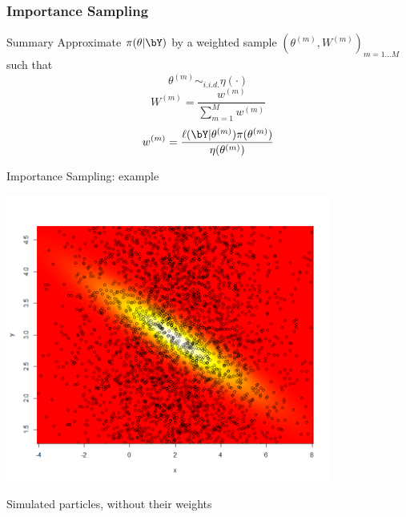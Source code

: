 \begin{frame}\frametitle{Importance Sampling}

\begin{block}{Summary}
 Approximate $\pi(\theta | \bY)$ by a weighted sample $(\theta^{(m)}, W^{(m)})_{m=1\dots M}$ such that
$$ \theta^{(m)} \sim_{i.i.d.} \eta(\cdot)$$ 
$$W^{(m)} = \frac{w^{(m)}}{ \sum_{m=1}^M w^{(m)}}$$
$$ w^{(m)} = \frac{ \ell(\bY | \theta^{(m)}) \pi(\theta^{(m)})}{ \eta(\theta ^{(m)})}$$
\end{block}
\end{frame}


\begin{frame}{Importance Sampling: example}

\centering
 \includegraphics[width=0.8\textwidth]{figures/IS_sampling.png}
 
 Simulated particles, without their weights
 \end{frame}

